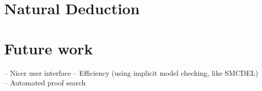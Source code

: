\documentclass[11pt,a4paper]{article}
\begin{document}









\section{Natural Deduction}

\section{Future work}
-- Nicer user interface
-- Efficiency (using implicit model checking, like SMCDEL)\\
-- Automated proof search




\end{document}
